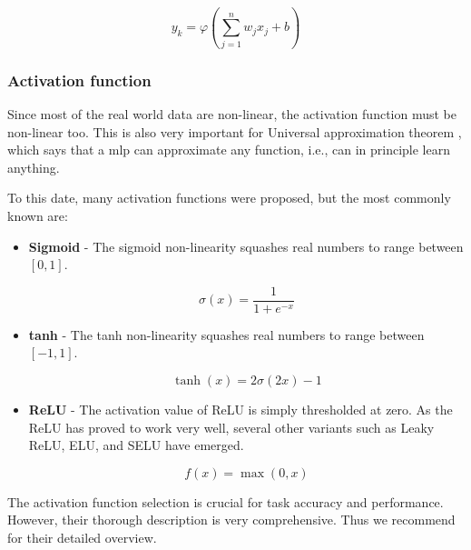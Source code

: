             \begin{equation}
                y_k = \varphi \left(\sum\limits_{j=1}^n w_j x_j + b \right)
            \end{equation}
        
        \subsubsection{Activation function}
            Since most of the real world data are non-linear, the activation function must be non-linear too. This is also very important for Universal approximation theorem \cite{hornik1989multilayer}, which says that a \gls{mlp} can approximate any function, i.e., can in principle learn anything. 
            
            To this date, many activation functions were proposed, but the most commonly known are:
            
           \begin{itemize}
                \item \textbf{Sigmoid} - The sigmoid non-linearity squashes real numbers to range between $[0,1]$.
                
                \begin{equation}
                   \sigma(x) = \frac{1}{1 + e^{-x}}
                \end{equation}
                
                \item \textbf{tanh} - The tanh non-linearity squashes real numbers to range between $[-1,1]$.
                
                \begin{equation}
                    \tanh(x) =  2\sigma(2x) - 1
                \end{equation}
                
                \item \textbf{ReLU} - The activation value of ReLU is simply thresholded at zero. As the ReLU has proved to work very well, several other variants such as Leaky ReLU, ELU, and SELU have emerged.
                
                \begin{equation}
                    f(x) = \max(0, x)
                \end{equation}
            \end{itemize}
    
            The activation function selection is crucial for task accuracy and performance. However, their thorough description is very comprehensive. Thus we recommend \cite{cs231n} for their detailed overview.


